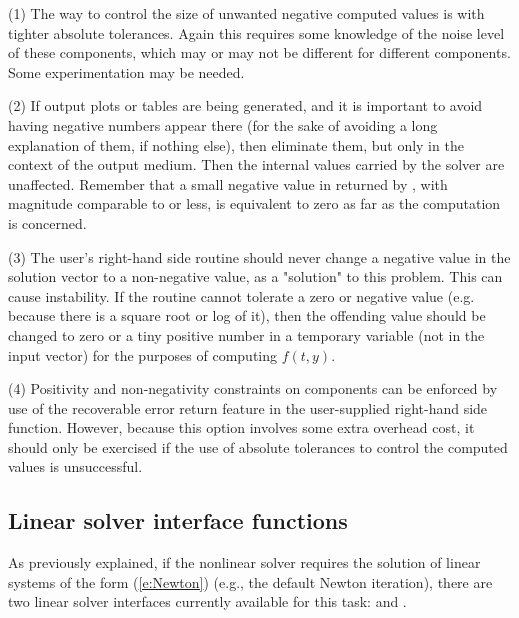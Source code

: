 (1) The way to control the size of unwanted negative computed values
is with tighter absolute tolerances.  Again this requires some
knowledge of the noise level of these components, which may or may not
be different for different components.  Some experimentation may be
needed.

(2) If output plots or tables are being generated, and it is important
to avoid having negative numbers appear there (for the sake of avoiding
a long explanation of them, if nothing else), then eliminate them, but
only in the context of the output medium.  Then the internal values carried
by the solver are unaffected.  Remember that a small negative value in 
returned by {\cvode}, with magnitude comparable to  or less,
is equivalent to zero as far as the computation is concerned.

(3) The user's right-hand side routine  should never change a
negative value in the solution vector  to a non-negative value,
as a "solution" to this problem.  This can cause instability.  If the
 routine cannot tolerate a zero or negative value (e.g. because
there is a square root or log of it), then the offending value should
be changed to zero or a tiny positive number in a temporary variable
(not in the input  vector) for the purposes of computing $f(t,y)$.

(4) Positivity and non-negativity constraints on components can be
enforced by use of the recoverable error return feature in the
user-supplied right-hand side function.  However, because this option
involves some extra overhead cost, it should only be exercised if the
use of absolute tolerances to control the computed values is
unsuccessful.

\subsection{Linear solver interface functions}\label{sss:lin_solv_init}

As previously explained, if the nonlinear solver requires the solution of
linear systems of the form (\ref{e:Newton}) (e.g., the default Newton
iteration), there are two {\cvode} linear solver interfaces currently
available for this task: {\cvls} and {\cvdiag}.

